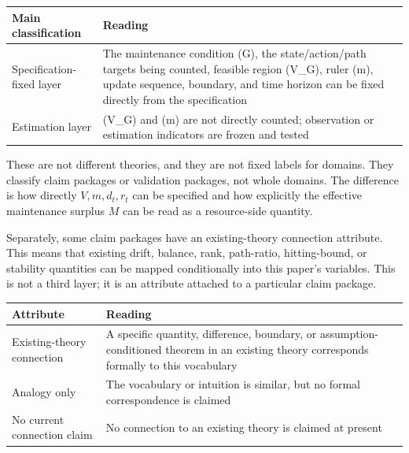 \documentclass[12pt,a4paper]{article}
\begin{document}
{\def\LTcaptype{table} %
\begin{longtable}[]{@{}
  >{\raggedright\arraybackslash}p{}
  >{\raggedright\arraybackslash}p{}@{}}
\toprule\noalign{}
\begin{minipage}[b]{\linewidth}\raggedright
Main classification
\end{minipage} & \begin{minipage}[b]{\linewidth}\raggedright
Reading
\end{minipage} \\
\midrule\noalign{}
\endhead
\bottomrule\noalign{}
\endlastfoot
Specification-fixed layer & The maintenance condition (G), the state/action/path targets being counted, feasible region (V\_G), ruler (m), update sequence, boundary, and time horizon can be fixed directly from the specification \\
Estimation layer & (V\_G) and (m) are not directly counted; observation or estimation indicators are frozen and tested \\
\end{longtable}
}

These are not different theories, and they are not fixed labels for domains. They classify claim packages or validation packages, not whole domains. The difference is how directly \(V,m,d_{t},r_{t}\) can be specified and how explicitly the effective maintenance surplus \(M\) can be read as a resource-side quantity.

Separately, some claim packages have an existing-theory connection attribute. This means that existing drift, balance, rank, path-ratio, hitting-bound, or stability quantities can be mapped conditionally into this paper's variables. This is not a third layer; it is an attribute attached to a particular claim package.

{\def\LTcaptype{table} %
\begin{longtable}[]{@{}
  >{\raggedright\arraybackslash}p{}
  >{\raggedright\arraybackslash}p{}@{}}
\toprule\noalign{}
\begin{minipage}[b]{\linewidth}\raggedright
Attribute
\end{minipage} & \begin{minipage}[b]{\linewidth}\raggedright
Reading
\end{minipage} \\
\midrule\noalign{}
\endhead
\bottomrule\noalign{}
\endlastfoot
Existing-theory connection & A specific quantity, difference, boundary, or assumption-conditioned theorem in an existing theory corresponds formally to this vocabulary \\
Analogy only & The vocabulary or intuition is similar, but no formal correspondence is claimed \\
No current connection claim & No connection to an existing theory is claimed at present \\
\end{longtable}
}
\end{document}
